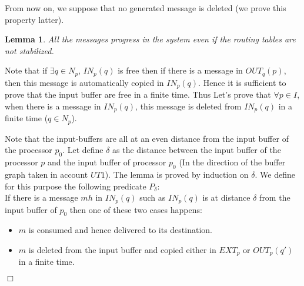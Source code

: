\documentclass{llncs}
\renewenvironment{proof}{{\it Proof. } }{{\hfill $\Box$}\vspace{.5pc}}
\newtheorem{lem}{Lemma}
\begin{document}
From now on, we suppose that no generated message is deleted (we prove this property latter).

\begin{lem}\label{DeadStable}
All the messages progress in the system even if the routing tables are not stabilized.
\end{lem}

\begin{proof}
Note that if $\exists q \in N_{p}$, $IN_{p}(q)$ is free then if there is a message in $OUT_{q}(p)$, then this message is automatically copied in $IN_{p}(q)$. Hence it is sufficient to prove that the input buffer are free in a finite time. Thus Let's prove that $\forall p \in I$, when there is a message in $IN_{p}(q)$, this message is deleted from $IN_{p}(q)$ in a finite time ($q\in N_{p}$). 



Note that the input-buffers are all at an even distance from the input buffer of the processor $p_{0}$. Let define $\delta$ as the distance between the input buffer of the processor $p$ and the input buffer of processor $p_{0}$ (In the direction of the buffer graph taken in account $UT1$). The lemma is proved by induction on $\delta$. We define for this purpose the following predicate $P_{\delta}$: \\

If there is a message $mh$ in $IN_{p}(q)$ such as $IN_{p}(q)$ is at distance $\delta$ from the input buffer of $p_{0}$ then one of these two cases happens:
\begin{itemize}
\item{$m$ is consumed and hence delivered to its destination.}
\item{$m$ is deleted from the input buffer and copied either in $EXT_{p}$ or  $OUT_{p}(q')$ in a finite time.}\end{itemize}


\end{proof}
\end{document}

